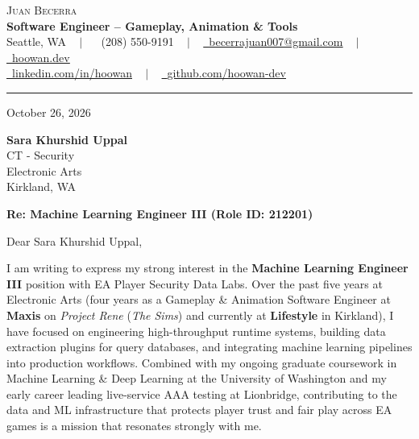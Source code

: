 \documentclass[letterpaper,11pt]{article}
\begin{document}
\begin{center}
    {\Huge \scshape Juan Becerra} \\ \vspace{4pt}
    \textbf{\large Software Engineer -- Gameplay, Animation \& Tools} \\ \vspace{4pt}
    \small Seattle, WA ~ $|$ ~
    \raisebox{-0.1\height}\faPhone\ (208) 550-9191 ~ $|$ ~
    \href{mailto:becerrajuan007@gmail.com}{\raisebox{-0.2\height}\faEnvelope\ \underline{becerrajuan007@gmail.com}} ~ $|$ ~
    \href{https://hoowan.dev}{\raisebox{-0.2\height}\faGlobe\ \underline{hoowan.dev}} \\ \vspace{2pt}
    \href{https://linkedin.com/in/hoowan/}{\raisebox{-0.2\height}\faLinkedin\ \underline{linkedin.com/in/hoowan}} ~ $|$ ~
    \href{https://github.com/hoowan-dev}{\raisebox{-0.2\height}\faGithub\ \underline{github.com/hoowan-dev}}
\end{center}

\vspace{4pt}
\hrule
\vspace{14pt}

\noindent October 26, 2026

\vspace{8pt}
\noindent \textbf{Sara Khurshid Uppal} \\
CT - Security \\
Electronic Arts \\
Kirkland, WA

\vspace{8pt}
\noindent \textbf{Re: Machine Learning Engineer III (Role ID: 212201)}

\vspace{8pt}
\noindent Dear Sara Khurshid Uppal,

I am writing to express my strong interest in the \textbf{Machine Learning Engineer III} position 
with EA Player Security Data Labs. Over the past five years at Electronic Arts (four years as a 
Gameplay \& Animation Software Engineer at \textbf{Maxis} on \emph{Project Rene} (\emph{The Sims}) 
and currently at \textbf{Lifestyle} in Kirkland), I have focused on engineering high-throughput 
runtime systems, building data extraction plugins for query databases, and integrating machine 
learning pipelines into production workflows. Combined with my ongoing graduate coursework in 
Machine Learning \& Deep Learning at the University of Washington and my early career leading 
live-service AAA testing at Lionbridge, contributing to the data and ML infrastructure that 
protects player trust and fair play across EA games is a mission that resonates strongly with me.
\end{document}
